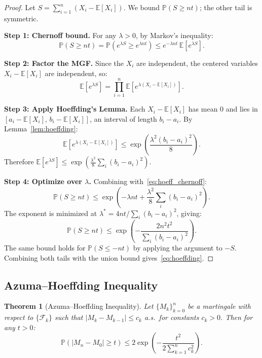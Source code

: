 \documentclass[11pt,a4paper]{article}
\theoremstyle{definition}
\theoremstyle{plain}
\newtheorem{theorem}{Theorem}[section]
\theoremstyle{remark}
\newcommand{\E}{\mathbb{E}}
\newcommand{\Prob}{\mathbb{P}}
\begin{document}
\begin{proof}
Let $S = \sum_{i=1}^n (X_i - \E[X_i])$. We bound $\Prob(S \geq nt)$; the other tail is symmetric.

\textbf{Step 1: Chernoff bound.} For any $\lambda > 0$, by Markov's inequality:
\begin{equation}
    \Prob(S \geq nt) = \Prob(e^{\lambda S} \geq e^{\lambda nt}) \leq e^{-\lambda nt}\, \E[e^{\lambda S}].
    \label{eq:hoeff_chernoff}
\end{equation}

\textbf{Step 2: Factor the MGF.} Since the $X_i$ are independent, the centered variables $X_i - \E[X_i]$ are independent, so:
\begin{equation}
    \E[e^{\lambda S}] = \prod_{i=1}^n \E[e^{\lambda(X_i - \E[X_i])}].
\end{equation}

\textbf{Step 3: Apply Hoeffding's Lemma.} Each $X_i - \E[X_i]$ has mean $0$ and lies in $[a_i - \E[X_i],\, b_i - \E[X_i]]$, an interval of length $b_i - a_i$. By Lemma~\ref{lem:hoeffding}:
\begin{equation}
    \E[e^{\lambda(X_i - \E[X_i])}] \leq \exp\!\left(\frac{\lambda^2(b_i - a_i)^2}{8}\right).
\end{equation}
Therefore $\E[e^{\lambda S}] \leq \exp\!\left(\frac{\lambda^2}{8}\sum_i (b_i - a_i)^2\right)$.

\textbf{Step 4: Optimize over $\lambda$.} Combining with~\eqref{eq:hoeff_chernoff}:
\begin{equation}
    \Prob(S \geq nt) \leq \exp\!\left(-\lambda nt + \frac{\lambda^2}{8}\sum_i (b_i - a_i)^2\right).
\end{equation}
The exponent is minimized at $\lambda^* = 4nt / \sum_i(b_i - a_i)^2$, giving:
\begin{equation}
    \Prob(S \geq nt) \leq \exp\!\left(-\frac{2n^2t^2}{\sum_i(b_i-a_i)^2}\right).
\end{equation}
The same bound holds for $\Prob(S \leq -nt)$ by applying the argument to $-S$. Combining both tails with the union bound gives~\eqref{eq:hoeffding}.
\end{proof}

\subsection{Azuma--Hoeffding Inequality}
\label{subsec:azuma}

\begin{keyresult}
\begin{theorem}[Azuma--Hoeffding Inequality]
\label{thm:azuma}
Let $\{M_k\}_{k=0}^n$ be a martingale with respect to $\{\mathcal{F}_k\}$ such that $|M_k - M_{k-1}| \leq c_k$ a.s.\ for constants $c_k > 0$. Then for any $t > 0$:
\begin{equation}
    \Prob(|M_n - M_0| \geq t) \leq 2\exp\!\left(-\frac{t^2}{2\sum_{k=1}^n c_k^2}\right).
    \label{eq:azuma}
\end{equation}
\end{theorem}
\end{keyresult}
\end{document}
